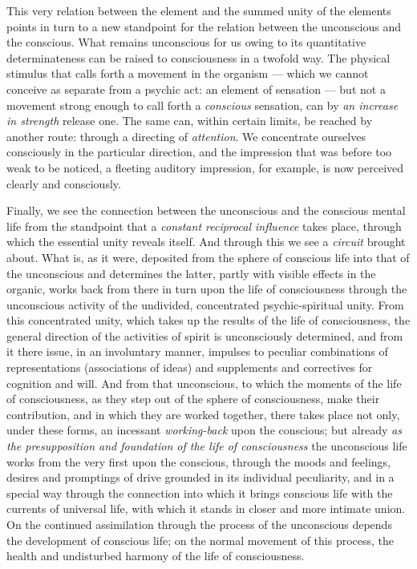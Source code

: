 \documentclass[12pt,a4paper,openany]{book}
\newcommand{\opage}[1]{\marginnote{\footnotesize\textit{[#1]}}}
\begin{document}
This very relation between the element and the summed unity of the
elements points in turn to a new standpoint for the relation between
the unconscious and the conscious. What remains unconscious for us
owing to its quantitative determinateness can be raised to
consciousness in a twofold way. The physical stimulus that calls forth
a movement in the organism --- which we cannot conceive as separate
from a psychic act: an element of sensation --- but not a movement
strong enough to call forth a \emph{conscious} sensation, can by
\emph{an increase in strength} release one. The same can, within
certain limits, be reached by another route: through a directing of
\emph{attention}. We concentrate ourselves consciously in the
particular direction, and the impression that was before too weak to
be noticed, a fleeting auditory impression, for example, is now
perceived clearly and consciously.

\opage{51}Finally, we see the connection between the unconscious and
the conscious mental life from the standpoint that a \emph{constant
reciprocal influence} takes place, through which the essential unity
reveals itself. And through this we see a \emph{circuit} brought
about. What is, as it were, deposited from the sphere of conscious
life into that of the unconscious and determines the latter, partly
with visible effects in the organic, works back from there in turn
upon the life of consciousness through the unconscious activity of
the undivided, concentrated psychic-spiritual unity. From this
concentrated unity, which takes up the results of the life of
consciousness, the general direction of the activities of spirit is
unconsciously determined, and from it there issue, in an involuntary
manner, impulses to peculiar combinations of representations
(associations of ideas) and supplements and correctives for cognition
and will. And from that unconscious, to which the moments of the life
of consciousness, as they step out of the sphere of consciousness,
make their contribution, and in which they are worked together, there
takes place not only, under these forms, an incessant
\emph{working-back} upon the conscious; but already \emph{as the
presupposition and foundation of the life of consciousness} the
unconscious life works from the very first upon the conscious, through
the moods and feelings, desires and promptings of drive grounded in
its individual peculiarity, and in a special way through the
connection into which it brings conscious life with the currents of
universal life, with which it stands in closer and more intimate
union. On the continued assimilation through the process of the
unconscious depends the development of conscious life; on the normal
movement of this process, the health and undisturbed harmony of the
life of consciousness.
\end{document}
